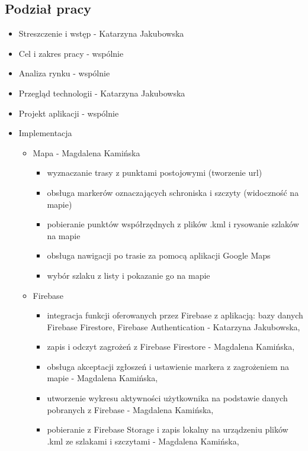    \subsection{Podział pracy}
    \begin{itemize}
        \item Streszczenie i wstęp - Katarzyna Jakubowska
        \item Cel i zakres pracy - wspólnie
        \item Analiza rynku - wspólnie
        \item Przegląd technologii - Katarzyna Jakubowska
        \item Projekt aplikacji - wspólnie
        \item Implementacja
        \begin{itemize}[label=$\circ$]
            \item Mapa - Magdalena Kamińska
            \begin{itemize}
                \item wyznaczanie trasy z punktami postojowymi (tworzenie url) 
                \item obsługa markerów oznaczających schroniska i szczyty (widoczność na mapie)
                \item pobieranie punktów współrzędnych z plików .kml i rysowanie szlaków na mapie 
                \item obsługa nawigacji po trasie za pomocą aplikacji Google Maps 
                \item wybór szlaku z listy i pokazanie go na mapie 
            \end{itemize}
            \item Firebase
            \begin{itemize}
                \item integracja funkcji oferowanych przez Firebase z aplikacją: bazy danych Firebase Firestore, Firebase Authentication - Katarzyna Jakubowska,
                \item zapis i odczyt zagrożeń z Firebase Firestore - Magdalena Kamińska,
                \item obsługa akceptacji zgłoszeń i ustawienie markera z zagrożeniem na mapie - Magdalena Kamińska,
                \item utworzenie wykresu aktywności użytkownika na podstawie danych pobranych z Firebase - Magdalena Kamińska,
                \item pobieranie z Firebase Storage i zapis lokalny na urządzeniu plików .kml ze szlakami i szczytami - Magdalena Kamińska,

\end{itemize}
\end{itemize}
\end{itemize}
